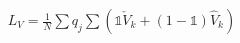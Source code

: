 \documentclass[preview]{standalone}
\begin{document}
\begin{align*}
L_V = \frac{1}{N} \sum q_j \sum (\mathbb{1} \check{V}_k + (1-\mathbb{1}) \hat{V}_k)
\end{align*}
\end{document}

